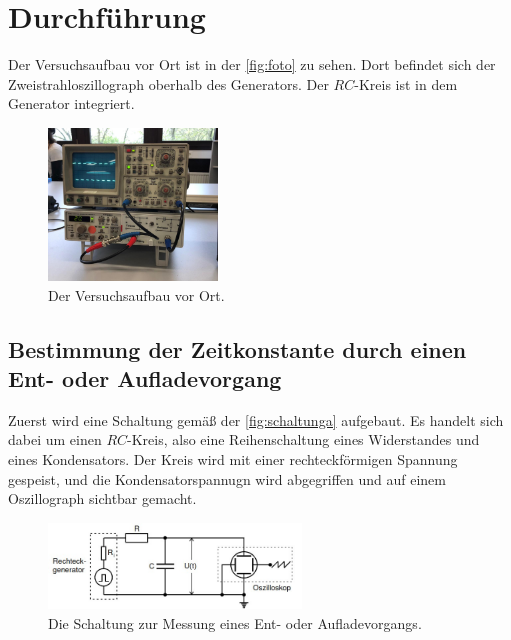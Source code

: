 \section{Durchführung}
\label{sec:Durchführung}

Der Versuchsaufbau vor Ort ist in der \autoref{fig:foto} zu sehen. Dort befindet sich der Zweistrahloszillograph oberhalb des Generators. Der $RC$-Kreis ist
in dem Generator integriert.

\begin{figure}
    \centering
    \includegraphics[width=0.4\textwidth]{bilder/foto_v353.jpeg}
    \caption{Der Versuchsaufbau vor Ort.}
    \label{fig:foto}
\end{figure}

\subsection{Bestimmung der Zeitkonstante durch einen Ent- oder Aufladevorgang}

    Zuerst wird eine Schaltung gemäß der \autoref{fig:schaltunga} aufgebaut. Es handelt sich dabei um einen $RC$-Kreis, also eine Reihenschaltung eines Widerstandes
    und eines Kondensators. Der Kreis wird mit einer rechteckförmigen Spannung gespeist, und die Kondensatorspannugn wird abgegriffen und auf einem Oszillograph
    sichtbar gemacht. 

    \begin{figure}[H]
        \centering
        \includegraphics[width=0.6\textwidth]{bilder/aufbau_schaltunga.jpg}
        \caption{Die Schaltung zur Messung eines Ent- oder Aufladevorgangs. \cite{anleitung}}
        \label{fig:schaltunga}
    \end{figure}


